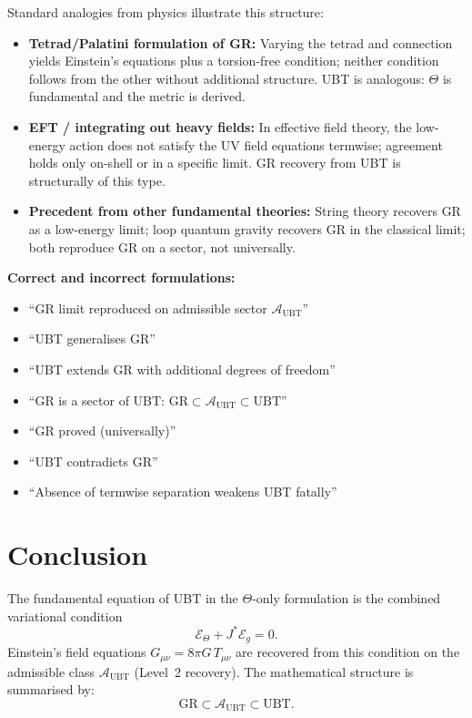 \documentclass[12pt]{article}
\theoremstyle{definition}
\theoremstyle{remark}
\begin{document}
Standard analogies from physics illustrate this structure:

\begin{itemize}
  \item \textbf{Tetrad/Palatini formulation of GR:} Varying the tetrad and
    connection yields Einstein's equations plus a torsion-free condition;
    neither condition follows from the other without additional structure.
    UBT is analogous: $\Theta$ is fundamental and the metric is derived.

  \item \textbf{EFT / integrating out heavy fields:} In effective field theory,
    the low-energy action does not satisfy the UV field equations termwise;
    agreement holds only on-shell or in a specific limit.  GR recovery from
    UBT is structurally of this type.

  \item \textbf{Precedent from other fundamental theories:} String theory
    recovers GR as a low-energy limit; loop quantum gravity recovers GR in
    the classical limit; both reproduce GR on a sector, not universally.
\end{itemize}

\medskip\noindent
\textbf{Correct and incorrect formulations:}
\begin{itemize}
  \item[\checkmark] ``GR limit reproduced on admissible sector $\mathcal{A}_{\mathrm{UBT}}$''
  \item[\checkmark] ``UBT generalises GR''
  \item[\checkmark] ``UBT extends GR with additional degrees of freedom''
  \item[\checkmark] ``GR is a sector of UBT: $\mathrm{GR}\subset\mathcal{A}_{\mathrm{UBT}}\subset\mathrm{UBT}$''
  \item[$\times$] ``GR proved (universally)''
  \item[$\times$] ``UBT contradicts GR''
  \item[$\times$] ``Absence of termwise separation weakens UBT fatally''
\end{itemize}

\section{Conclusion}
\label{sec:conclusion}

The fundamental equation of UBT in the $\Theta$-only formulation is the
combined variational condition
\begin{equation}
  \mathcal{E}_\Theta + J^{*}\mathcal{E}_g = 0.
  \label{eq:combined_final}
\end{equation}
Einstein's field equations $G_{\mu\nu} = 8\pi G\,T_{\mu\nu}$ are recovered
from this condition on the admissible class $\mathcal{A}_{\mathrm{UBT}}$
(Level~2 recovery).  The mathematical structure is summarised by:
\begin{equation}
  \mathrm{GR} \subset \mathcal{A}_{\mathrm{UBT}} \subset \mathrm{UBT}.
\end{equation}
\end{document}

